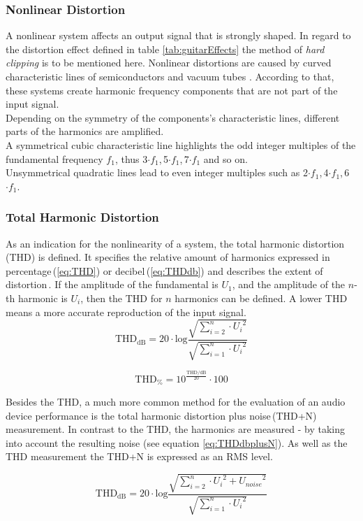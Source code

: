 \subsubsection{Nonlinear Distortion}
A nonlinear system affects an output signal that is strongly shaped. In regard to the distortion effect defined in table \ref{tab:guitarEffects} the method of \textit{hard clipping} is to be mentioned here. Nonlinear distortions are caused by curved characteristic lines of semiconductors and vacuum tubes \cite{Sengpiel:2007}. According to that, these systems create harmonic frequency components that are not part of the input signal.\\

Depending on the symmetry of the components's characteristic lines, different parts of the harmonics are amplified.\\
A symmetrical cubic characteristic line highlights the odd integer multiples of the fundamental frequency $f_1$, thus 3$\cdot f_1$,\,5$\cdot f_1$,\,7$\cdot f_1$ and so on.\\
Unsymmetrical quadratic lines lead to even integer multiples such as 2$\cdot f_1$,\,4$\cdot f_1$,\,6$\cdot f_1$.

\subsubsection{Total Harmonic Distortion}

As an indication for the nonlinearity of a system, the total harmonic distortion\,(THD) is defined.
It specifies the relative amount of harmonics expressed in percentage\,(\ref{eq:THD}) or decibel\,(\ref{eq:THDdb}) and describes the extent of distortion\,\cite{Rohde:2005}.
If the amplitude of the fundamental is $U_1$, and the amplitude of the $n$-th harmonic is $U_i$, then the 
THD for $n$ harmonics can be defined.
A lower THD means a more accurate reproduction of the input signal.\\


\begin{equation}
\mathrm{THD}_{\mathrm{dB}} = 20 \cdot \mathrm{log} \frac{\sqrt{\sum\limits_{i=2}^{n} \cdot {U_i}^2}}{{\sqrt{\sum\limits_{i=1}^{n} \cdot {U_i}^2}}}
\label{eq:THDdb}
\end{equation}

\begin{equation}
\mathrm{THD}_{\%} = 10^{\frac{\mathrm{THD/dB}}{20}} \cdot 100
\label{eq:THD}
\end{equation}

Besides the THD, a much more common method for the evaluation of an audio device performance is the total harmonic distortion plus noise\,(THD+N) measurement. In contrast to the THD, the harmonics are measured - by taking into account the resulting noise (see equation \ref{eq:THDdbplusN}).
As well as the THD measurement the THD+N is expressed as an RMS level.

\begin{equation}
\mathrm{THD}_{\mathrm{dB}} = 20 \cdot \mathrm{log} \frac{\sqrt{\sum\limits_{i=2}^{n} \cdot {U_i}^2 + {U_{noise}}^2}}{{\sqrt{\sum\limits_{i=1}^{n} \cdot {U_i}^2}}}
\label{eq:THDdbplusN}
\end{equation}


